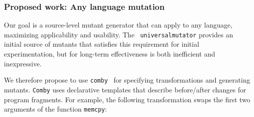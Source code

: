 \subsubsection{Proposed work: Any language mutation}

Our goal is a source-level mutant generator that can apply to any language,
maximizing applicability and usability.
 The {\tt
  universalmutator} provides an initial source of mutants that
satisfies this requirement for initial experimentation, but for
long-term effectiveness is both inefficient and inexpressive.



We therefore propose to use {\tt comby}~\cite{comby-github, rvt-ppc} for specifying
transformations and generating mutants. {\tt Comby} uses
declarative templates that describe before/after changes for program fragments. For example, the following transformation swaps the first two arguments of the function {\tt memcpy}:

